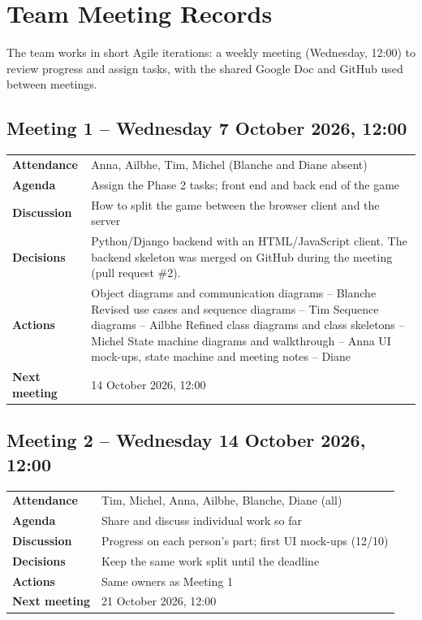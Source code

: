\documentclass[11pt,a4paper]{article}
\begin{document}
\section{Team Meeting Records}\label{sec:minutes}

The team works in short Agile iterations: a weekly meeting (Wednesday, 12:00) to review progress and assign tasks, with the shared Google Doc and GitHub used between meetings.

\subsection{Meeting 1 -- Wednesday 7 October 2026, 12:00}
\begin{tabularx}{\textwidth}{>{\bfseries}p{3cm} L}
Attendance & Anna, Ailbhe, Tim, Michel (Blanche and Diane absent)\\
Agenda & Assign the Phase 2 tasks; front end and back end of the game\\
Discussion & How to split the game between the browser client and the server\\
Decisions & Python/Django backend with an HTML/JavaScript client. The backend skeleton was merged on GitHub during the meeting (pull request \#2).\\
Actions & Object diagrams and communication diagrams -- Blanche\newline
Revised use cases and sequence diagrams -- Tim\newline
Sequence diagrams -- Ailbhe\newline
Refined class diagrams and class skeletons -- Michel\newline
State machine diagrams and walkthrough -- Anna\newline
UI mock-ups, state machine and meeting notes -- Diane\\
Next meeting & 14 October 2026, 12:00\\
\end{tabularx}

\subsection{Meeting 2 -- Wednesday 14 October 2026, 12:00}
\begin{tabularx}{\textwidth}{>{\bfseries}p{3cm} L}
Attendance & Tim, Michel, Anna, Ailbhe, Blanche, Diane (all)\\
Agenda & Share and discuss individual work so far\\
Discussion & Progress on each person's part; first UI mock-ups (12/10)\\
Decisions & Keep the same work split until the deadline\\
Actions & Same owners as Meeting 1\\
Next meeting & 21 October 2026, 12:00\\
\end{tabularx}
\end{document}
